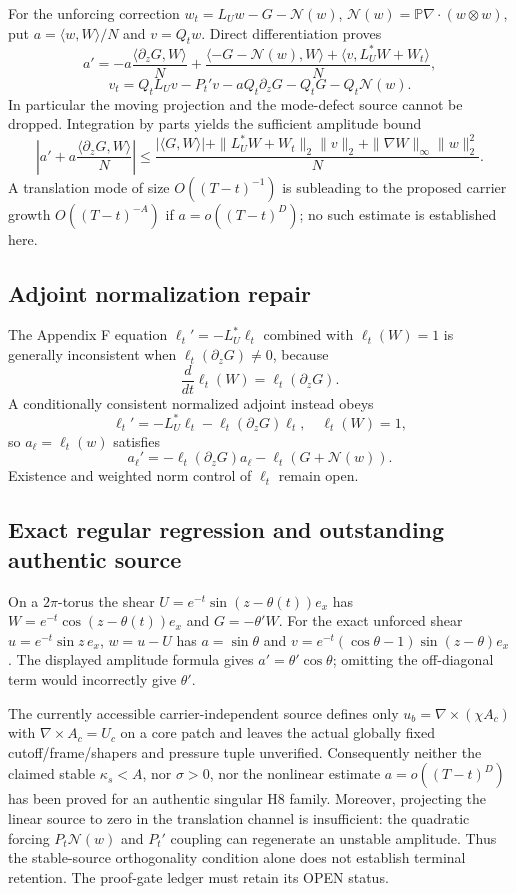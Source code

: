 For the unforcing correction $w_t=L_Uw-G-\mathcal N(w)$, $\mathcal N(w)=\mathbb P\nabla\cdot(w\otimes w)$, put $a=\langle w,W\rangle/N$ and $v=Q_tw$. Direct differentiation proves
\[
a'=-a\frac{\langle\partial_zG,W\rangle}{N}
+\frac{\langle-G-\mathcal N(w),W\rangle+
\langle v,L_U^*W+W_t\rangle}{N},
\]
\[
v_t=Q_tL_Uv-P_t'v-aQ_t\partial_zG-Q_tG-Q_t\mathcal N(w).
\]
In particular the moving projection and the mode-defect source cannot be dropped. Integration by parts yields the sufficient amplitude bound
\[
\left|a'+a\frac{\langle\partial_zG,W\rangle}{N}\right|
\le\frac{|\langle G,W\rangle|+
\|L_U^*W+W_t\|_2\|v\|_2+
\|\nabla W\|_\infty\|w\|_2^2}{N}.
\]
A translation mode of size $O((T-t)^{-1})$ is subleading to the proposed carrier growth $O((T-t)^{-A})$ if $a=o((T-t)^D)$; no such estimate is established here.

\subsection*{Adjoint normalization repair}
The Appendix F equation $\ell_t'=-L_U^*\ell_t$ combined with $\ell_t(W)=1$ is generally inconsistent when $\ell_t(\partial_zG)\ne0$, because
\[
\frac d{dt}\ell_t(W)=\ell_t(\partial_zG).
\]
A conditionally consistent normalized adjoint instead obeys
\[
\ell_t'=-L_U^*\ell_t-\ell_t(\partial_zG)\ell_t,\quad \ell_t(W)=1,
\]
so $a_\ell=\ell_t(w)$ satisfies
\[
a_\ell'=-\ell_t(\partial_zG)a_\ell-\ell_t(G+\mathcal N(w)).
\]
Existence and weighted norm control of $\ell_t$ remain open.

\subsection*{Exact regular regression and outstanding authentic source}
On a $2\pi$-torus the shear $U=e^{-t}\sin(z-\theta(t))e_x$ has
$W=e^{-t}\cos(z-\theta(t))e_x$ and $G=-\theta'W$.
For the exact unforced shear $u=e^{-t}\sin z\,e_x$,
$w=u-U$ has $a=\sin\theta$ and
$v=e^{-t}(\cos\theta-1)\sin(z-\theta)e_x$.
The displayed amplitude formula gives $a'=\theta'\cos\theta$; omitting the off-diagonal term would incorrectly give $\theta'$.

The currently accessible carrier-independent source defines only $u_b=\nabla\times(\chi A_c)$ with $\nabla\times A_c=U_c$ on a core patch and leaves the actual globally fixed cutoff/frame/shapers and pressure tuple unverified. Consequently neither the claimed stable $\kappa_s<A$, nor $\sigma>0$, nor the nonlinear estimate $a=o((T-t)^D)$ has been proved for an authentic singular H8 family. Moreover, projecting the linear source to zero in the translation channel is insufficient: the quadratic forcing $P_t\mathcal N(w)$ and $P_t'$ coupling can regenerate an unstable amplitude. Thus the stable-source orthogonality condition alone does not establish terminal retention. The proof-gate ledger must retain its OPEN status.